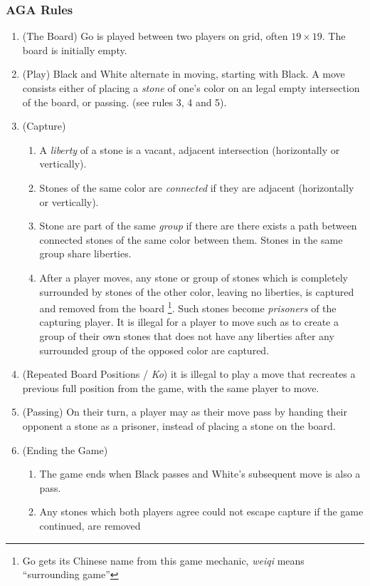\documentclass[../math194_paper.tex]{subfiles}
\begin{document}
\subsubsection{AGA Rules}
\begin{enumerate}
\item (The Board) Go is played between two players on grid, often $19\times19$. The board
is initially empty. 
\item (Play) Black and White alternate in moving, starting with Black. A move consists
either of placing a \textit{stone} of one's color on an legal empty intersection of the board, or passing.
(see rules 3, 4 and 5).
\item (Capture) 
\begin{enumerate}
    \item  A \textit{liberty} of a stone is a vacant, adjacent intersection (horizontally or vertically). 
    \item Stones of the same color are \textit{connected} if they are adjacent (horizontally or vertically). 
    \item Stone are part of the same \textit{group} if there are there exists a path between 
     connected stones of the same color between them. Stones in the same group share liberties.
    \item After a player moves, any stone or group of stones which is completely surrounded 
    by stones of the other color, leaving no liberties, is captured and removed from the 
    board \footnote{Go gets its Chinese name from this game mechanic, \textit{weiqi} means 
    ``surrounding game''}. 
    Such stones become \textit{prisoners} of the capturing player. 
    It is  illegal for a
    player to move such as to create a group of their own stones that does not have any
    liberties after any surrounded group of the opposed color are captured.
\end{enumerate}
\item (Repeated Board Positions / \textit{Ko}) it is illegal to play 
a move that recreates a previous full position from the game, with the 
same player to move.
\item (Passing) On their turn, a player may as their move pass by handing their opponent a stone as a prisoner,
instead of placing a stone on the board.
\item (Ending the Game) 
\begin{enumerate} 
    \item The game ends when Black passes and White's subsequent move is also a pass.
    \item Any stones which both players agree could not escape capture if the game continued, are removed 

\end{enumerate}
\end{enumerate}
\end{document}
